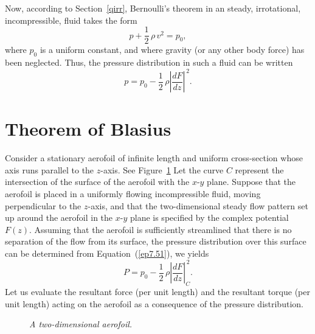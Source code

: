 Now, according to Section~\ref{qirr}, Bernoulli's theorem in an steady, irrotational, incompressible, fluid takes the form
\begin{equation}
p +\frac{1}{2}\,\rho\,v^2 = p_0,
\end{equation}
where $p_0$ is a uniform constant, and where gravity (or any other body force) has been neglected. Thus, the
pressure distribution in such a fluid can be written
\begin{equation}\label{ep7.51}
p = p_0 -\frac{1}{2}\,\rho\left|\frac{dF}{dz}\right|^{\,2}.
\end{equation}

\section{Theorem of Blasius}\label{sblasius}
Consider a stationary aerofoil of infinite length and uniform cross-section whose axis runs parallel to the $z$-axis. See Figure~\ref{faero} Let the
curve $C$ represent the intersection of the surface of the aerofoil with the $x$-$y$ plane. Suppose that the aerofoil
is placed in a uniformly flowing incompressible fluid, moving perpendicular to the $z$-axis, and that the two-dimensional steady flow pattern set up around the aerofoil in the $x$-$y$ plane is specified by the
complex potential $F(z)$.  Assuming that the aerofoil is sufficiently streamlined that there is no separation of the flow
from its surface, the  pressure distribution over this surface can be determined from Equation~(\ref{ep7.51}), we yields
\begin{equation}\label{ep7.52}
P = p_0  -\frac{1}{2}\,\rho\left|\frac{dF}{dz}\right|^{\,2}_C.
\end{equation}
Let us evaluate the resultant force (per unit length) and the resultant torque (per unit length) acting on the aerofoil
as a consequence of the pressure distribution.

\begin{figure}
\epsfysize=3in
\centerline{}
\caption{\em A two-dimensional aerofoil.}\label{faero}
\end{figure}

